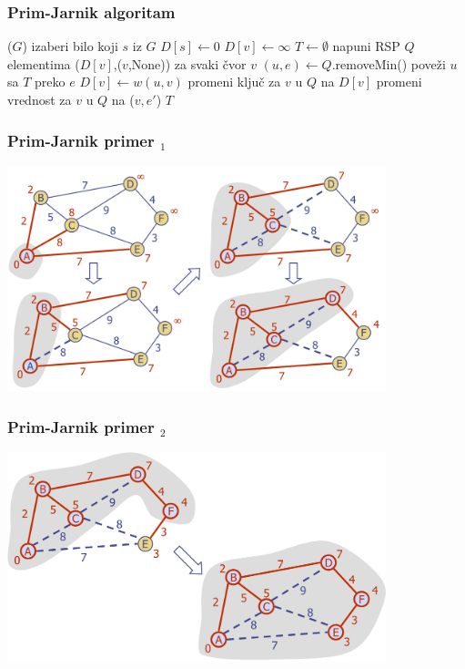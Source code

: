 \documentclass[compress]{beamer}
\begin{document}
\begin{frame}[fragile,shrink=2]
  \frametitle{Prim-Jarnik algoritam}
  \begin{algorithmic}
    \STATE {}($G$)
    \STATE izaberi bilo koji $s$ iz $G$
    \STATE $D[s] \leftarrow 0$
      \STATE $D[v] \leftarrow \infty$
    \ENDFOR
    \STATE $T \leftarrow \emptyset$
    \STATE napuni RSP $Q$ elementima ($D[v]$,($v$,None)) za svaki čvor $v$
      \STATE $(u,e) \leftarrow Q$.removeMin()
      \STATE poveži $u$ sa $T$ preko $e$
        \STATE {}
          \STATE $D[v] \leftarrow w(u,v)$
          \STATE promeni ključ za $v$ u $Q$ na $D[v]$
          \STATE promeni vrednost za $v$ u $Q$ na ($v,e'$)
        \ENDIF
      \ENDFOR
    \ENDWHILE
    \RETURN $T$
  \end{algorithmic}
\end{frame}

\begin{frame}[fragile]
  \frametitle{Prim-Jarnik primer $_1$}
  \begin{center}
    \includegraphics[width=11cm]{asp-14-pic72.png}
  \end{center}
\end{frame}

\begin{frame}[fragile]
  \frametitle{Prim-Jarnik primer $_2$}
  \begin{center}
    \includegraphics[width=11cm]{asp-14-pic73.png}
  \end{center}
\end{frame}
\end{document}
